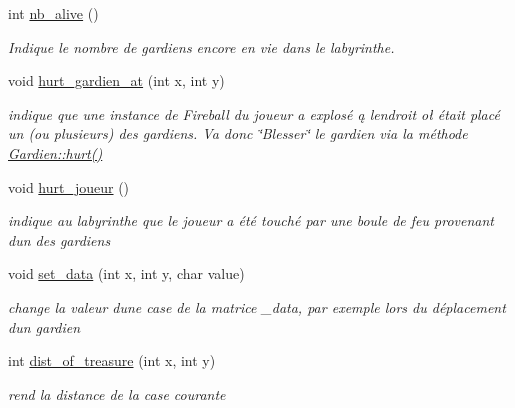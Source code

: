 \begin{DoxyCompactItemize}
int \hyperlink{classLabyrinthe_ab13197de5f094c67422e558c2347dbe8}{nb\+\_\+alive} ()
\begin{DoxyCompactList}\small\item\em Indique le nombre de gardiens encore en vie dans le labyrinthe. \end{DoxyCompactList}\item 
void \hyperlink{classLabyrinthe_a9c7c46b8c376f8b9ab0310ae1d0a369c}{hurt\+\_\+gardien\+\_\+at} (int x, int y)
\begin{DoxyCompactList}\small\item\em indique que une instance de Fireball du joueur a explosé ą l\textquotesingle{}endroit oł était placé un (ou plusieurs) des gardiens. Va donc \char`\"{}\+Blesser\char`\"{} le gardien via la méthode \hyperlink{classGardien_ac4ba490e309de80c1449fc5baef90390}{Gardien\+::hurt()} \end{DoxyCompactList}\item 
void \hyperlink{classLabyrinthe_a28666f6cd5a5f32d41d664204a717593}{hurt\+\_\+joueur} ()
\begin{DoxyCompactList}\small\item\em indique au labyrinthe que le joueur a été touché par une boule de feu provenant d\textquotesingle{}un des gardiens \end{DoxyCompactList}\item 
void \hyperlink{classLabyrinthe_acc7682cd69ca12f27cb65457c9c8e89b}{set\+\_\+data} (int x, int y, char value)
\begin{DoxyCompactList}\small\item\em change la valeur d\textquotesingle{}une case de la matrice \+\_\+data, par exemple lors du déplacement d\textquotesingle{}un gardien \end{DoxyCompactList}\item 
int \hyperlink{classLabyrinthe_afed17fdb2dce31cb4671da03c05b88d7}{dist\+\_\+of\+\_\+treasure} (int x, int y)
\begin{DoxyCompactList}\small\item\em rend la distance de la case courante \end{DoxyCompactList}\end{DoxyCompactItemize}

